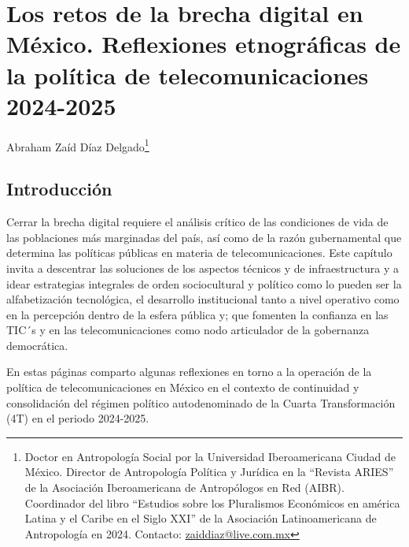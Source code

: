 \documentclass[
  spanish,
  11pt,
  a4paper,
]{scrbook}
\begin{document}
\printbibliography[heading=subbibliography, title={Referencias Bibliográficas}]


\chapter{Los retos de la brecha digital en México. Reflexiones
etnográficas de la política de telecomunicaciones
2024-2025}\label{los-retos-de-la-brecha-digital-en-muxe9xico.-reflexiones-etnogruxe1ficas-de-la-poluxedtica-de-telecomunicaciones-2024-2025}


\begin{flushright} 
\Large Abraham Zaíd Díaz Delgado\footnote{Doctor en Antropología Social por la Universidad Iberoamericana Ciudad de México. Director de Antropología Política y Jurídica en la “Revista ARIES” de la Asociación Iberoamericana de Antropólogos en Red (AIBR). Coordinador del libro “Estudios sobre los Pluralismos Económicos en américa Latina y el Caribe en el Siglo XXI” de la Asociación Latinoamericana de Antropología en 2024. Contacto: \href{zaiddiaz@live.com.mx}{zaiddiaz@live.com.mx}}
\end{flushright}

\section*{Introducción}\label{introducciuxf3n}


Cerrar la brecha digital requiere el análisis crítico de las condiciones
de vida de las poblaciones más marginadas del país, así como de la razón
gubernamental que determina las políticas públicas en materia de
telecomunicaciones. Este capítulo invita a descentrar las soluciones de
los aspectos técnicos y de infraestructura y a idear estrategias
integrales de orden sociocultural y político como lo pueden ser la
alfabetización tecnológica, el desarrollo institucional tanto a nivel
operativo como en la percepción dentro de la esfera pública y; que
fomenten la confianza en las TIC´s y en las telecomunicaciones como nodo
articulador de la gobernanza democrática.

En estas páginas comparto algunas reflexiones en torno a la operación de
la política de telecomunicaciones en México en el contexto de
continuidad y consolidación del régimen político autodenominado de la
Cuarta Transformación (4T) en el periodo 2024-2025.
\end{document}
